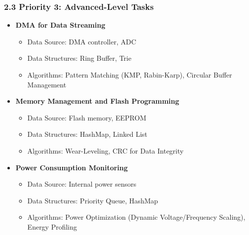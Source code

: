 \documentclass{article}
\begin{document}
\subsubsection*{2.3 Priority 3: Advanced-Level Tasks}
\begin{itemize}
    \item \textbf{DMA for Data Streaming}
    \begin{itemize}
        \item Data Source: DMA controller, ADC
        \item Data Structures: Ring Buffer, Trie
        \item Algorithms: Pattern Matching (KMP, Rabin-Karp), Circular Buffer Management
    \end{itemize}
    
    \item \textbf{Memory Management and Flash Programming}
    \begin{itemize}
        \item Data Source: Flash memory, EEPROM
        \item Data Structures: HashMap, Linked List
        \item Algorithms: Wear-Leveling, CRC for Data Integrity
    \end{itemize}
    
    \item \textbf{Power Consumption Monitoring}
    \begin{itemize}
        \item Data Source: Internal power sensors
        \item Data Structures: Priority Queue, HashMap
        \item Algorithms: Power Optimization (Dynamic Voltage/Frequency Scaling), Energy Profiling
    \end{itemize}
\end{itemize}
\end{document}
